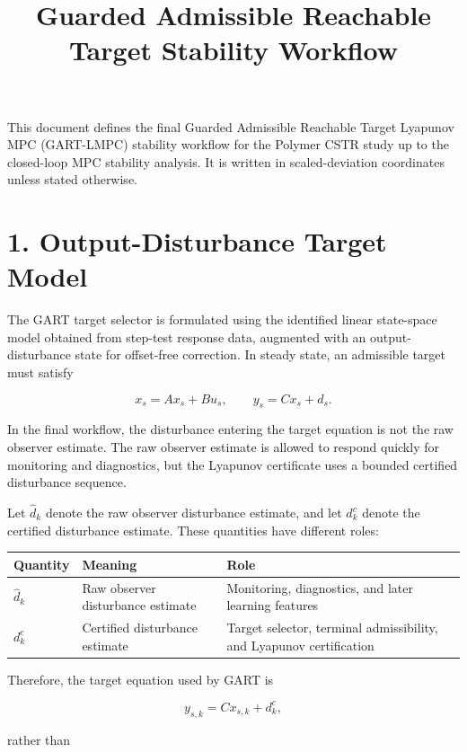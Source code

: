 \documentclass[11pt]{article}
\title{Guarded Admissible Reachable Target Stability Workflow}
\author{}
\date{}
\begin{document}
\maketitle

This document defines the final Guarded Admissible Reachable Target Lyapunov MPC (GART-LMPC) stability workflow for the Polymer CSTR study up to the closed-loop MPC stability analysis. It is written in scaled-deviation coordinates unless stated otherwise.


\section*{1. Output-Disturbance Target Model}

The GART target selector is formulated using the identified linear state-space model obtained from step-test response data, augmented with an output-disturbance state for offset-free correction. In steady state, an admissible target must satisfy


\[
x_s = A x_s + B u_s,
\qquad
y_s = C x_s + d_s .
\]

In the final workflow, the disturbance entering the target equation is not the raw observer estimate. The raw observer estimate is allowed to respond quickly for monitoring and diagnostics, but the Lyapunov certificate uses a bounded certified disturbance sequence.


Let $\hat d_k$ denote the raw observer disturbance estimate, and let $d^c_k$ denote the certified disturbance estimate. These quantities have different roles:


\begingroup
\small
\setlength{\tabcolsep}{3pt}
\begin{longtable}{>{\raggedright\arraybackslash}p{}>{\raggedright\arraybackslash}p{}>{\raggedright\arraybackslash}p{}}
\toprule
Quantity & Meaning & Role \\
\midrule
\endhead
$\hat d_k$ & Raw observer disturbance estimate & Monitoring, diagnostics, and later learning features \\
$d^c_k$ & Certified disturbance estimate & Target selector, terminal admissibility, and Lyapunov certification \\
\bottomrule
\end{longtable}
\endgroup


Therefore, the target equation used by GART is


\[
y_{s,k}=C x_{s,k}+d^c_k,
\]

rather than
\end{document}

